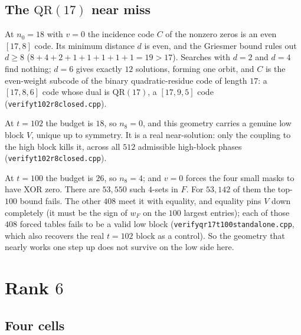 \documentclass[11pt]{article}
\theoremstyle{definition}
\theoremstyle{remark}
\newcommand{\code}[1]{\texttt{#1}}
\DeclareRobustCommand{\_}{\textunderscore\allowbreak}
\begin{document}
\subsection{The $\mathrm{QR}(17)$ near miss}\label{sec:qr17}

At $n_0=18$ with $v=0$ the incidence code $C$ of the nonzero zeros is an even $[17,8]$ code. Its minimum distance $d$ is even, and the Griesmer bound rules out $d\ge8$ ($8+4+2+1+1+1+1+1=19>17$). Searches with $d=2$ and $d=4$ find nothing; $d=6$ gives exactly $12$ solutions, forming one orbit, and $C$ is the even-weight subcode of the binary quadratic-residue code of length $17$: a $[17,8,6]$ code whose dual is $\mathrm{QR}(17)$, a $[17,9,5]$ code~\cite{MS} (\code{verify\_t102\_r8\_closed.cpp}).

At $t=102$ the budget is $18$, so $n_8=0$, and this geometry carries a genuine low block $V$, unique up to symmetry. It is a real near-solution: only the coupling to the high block kills it, across all $512$ admissible high-block phases (\code{verify\_t102\_r8\_closed.cpp}).

At $t=100$ the budget is $26$, so $n_8=4$; and $v=0$ forces the four small masks to have XOR zero. There are $53{,}550$ such $4$-sets in $F$. For $53{,}142$ of them the top-$100$ bound fails. The other $408$ meet it with equality, and equality pins $V$ down completely (it must be the sign of $w_F$ on the $100$ largest entries); each of those $408$ forced tables fails to be a valid low block (\code{verify\_qr17\_t100\_standalone.cpp}, which also recovers the real $t=102$ block as a control). So the geometry that nearly works one step up does not survive on the low side here.

\section{Rank $6$}\label{sec:r6}

\subsection{Four cells}
\end{document}
